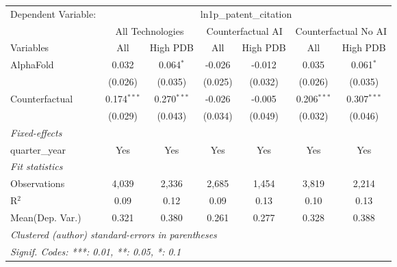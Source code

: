 \begingroup
\centering
\begin{tabular}{lcccccc}
   \tabularnewline \midrule \midrule
   Dependent Variable: & \multicolumn{6}{c}{ln1p\_patent\_citation}\\
 & \multicolumn{2}{c}{All Technologies} & \multicolumn{2}{c}{Counterfactual AI} & \multicolumn{2}{c}{Counterfactual No AI} \\
\cmidrule(lr){1-1}\cmidrule(lr){2-3} \cmidrule(lr){4-5} \cmidrule(lr){6-7}
Variables & \multicolumn{1}{c}{All} & \multicolumn{1}{c}{High PDB} & \multicolumn{1}{c}{All} & \multicolumn{1}{c}{High PDB} & \multicolumn{1}{c}{All} & \multicolumn{1}{c}{High PDB} \\
\cmidrule(lr){1-1}\cmidrule(lr){2-2} \cmidrule(lr){3-3} \cmidrule(lr){4-4} \cmidrule(lr){5-5} \cmidrule(lr){6-6} \cmidrule(lr){7-7}
   AlphaFold      & 0.032         & 0.064$^{*}$   & -0.026  & -0.012  & 0.035         & 0.061$^{*}$\\   
                  & (0.026)       & (0.035)       & (0.025) & (0.032) & (0.026)       & (0.035)\\   
   Counterfactual & 0.174$^{***}$ & 0.270$^{***}$ & -0.026  & -0.005  & 0.206$^{***}$ & 0.307$^{***}$\\   
                  & (0.029)       & (0.043)       & (0.034) & (0.049) & (0.032)       & (0.046)\\   
   \midrule
   \emph{Fixed-effects}\\
   quarter\_year  & Yes           & Yes           & Yes     & Yes     & Yes           & Yes\\  
   \midrule
   \emph{Fit statistics}\\
   Observations   & 4,039         & 2,336         & 2,685   & 1,454   & 3,819         & 2,214\\  
   R$^2$          & 0.09          & 0.12          & 0.09    & 0.13    & 0.10          & 0.13\\  
Mean(Dep. Var.) & 0.321 & 0.380 & 0.261 & 0.277 & 0.328 & 0.388 \\
   \midrule \midrule
   \multicolumn{7}{l}{\emph{Clustered (author) standard-errors in parentheses}}\\
   \multicolumn{7}{l}{\emph{Signif. Codes: ***: 0.01, **: 0.05, *: 0.1}}\\
\end{tabular}
\par\endgroup
